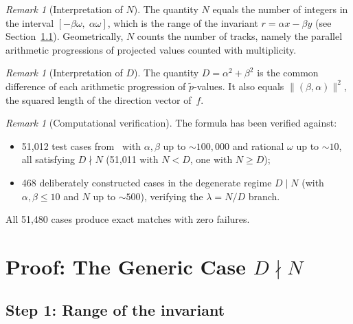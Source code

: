 \documentclass[11pt]{article}
\theoremstyle{plain}
\theoremstyle{definition}
\theoremstyle{remark}
\newtheorem{remark}[theorem]{Remark}
\begin{document}
\begin{remark}[Interpretation of \(N\)]\label{rem:N}
The quantity \(N\) equals the number of integers in the interval
\([-\beta\omega,\; \alpha\omega]\), which is the range of the invariant
\(r = \alpha x - \beta y\) (see Section~\ref{subsec:step1}).
Geometrically, \(N\) counts the number of tracks, namely the parallel
arithmetic progressions of projected values counted with multiplicity.
\end{remark}

\begin{remark}[Interpretation of \(D\)]\label{rem:D}
The quantity \(D = \alpha^2+\beta^2\) is the common difference of each
arithmetic progression of \(\tilde{p}\)-values.
It also equals \(\lVert(\beta,\alpha)\rVert^2\), the squared length of the
direction vector of~\(f\).
\end{remark}

\begin{remark}[Computational verification]\label{rem:verification}
The formula has been verified against:
\begin{itemize}
    \item 51{,}012 test cases from~\cite{Kunert2025} with
          \(\alpha, \beta\) up to \({\sim}100{,}000\) and rational \(\omega\)
          up to \({\sim}10\), all satisfying \(D \nmid N\)
          (51{,}011 with \(N < D\), one with \(N \ge D\));
    \item 468 deliberately constructed cases in the degenerate regime
          \(D \mid N\) (with \(\alpha, \beta \le 10\) and \(N\) up to
          \({\sim}500\)), verifying the \(\lambda = N/D\) branch.
\end{itemize}
All 51{,}480 cases produce exact matches with zero failures.
\end{remark}

\section{Proof: The Generic Case \(D \nmid N\)}\label{sec:proof}

\subsection{Step 1: Range of the invariant}\label{subsec:step1}
\end{document}
